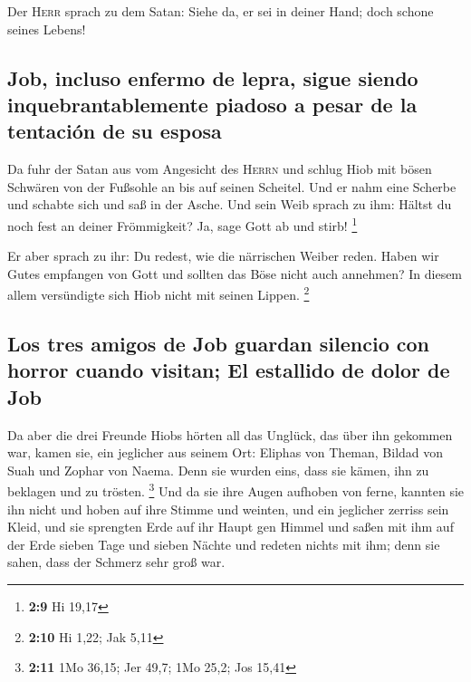  Der \textsc{Herr} sprach zu dem Satan: Siehe da, er sei
in deiner Hand; doch schone seines Lebens!

\hypertarget{job-incluso-enfermo-de-lepra-sigue-siendo-inquebrantablemente-piadoso-a-pesar-de-la-tentaciuxf3n-de-su-esposa}{%
\subsection{Job, incluso enfermo de lepra, sigue siendo
inquebrantablemente piadoso a pesar de la tentación de su
esposa}\label{job-incluso-enfermo-de-lepra-sigue-siendo-inquebrantablemente-piadoso-a-pesar-de-la-tentaciuxf3n-de-su-esposa}}

 Da fuhr der Satan aus vom Angesicht des \textsc{Herrn}
und schlug Hiob mit bösen Schwären von der Fußsohle an bis auf seinen
Scheitel.  Und er nahm eine Scherbe und schabte sich und
saß in der Asche.  Und sein Weib sprach zu ihm: Hältst du
noch fest an deiner Frömmigkeit? Ja, sage Gott ab und stirb! \footnote{\textbf{2:9}
  Hi 19,17}

 Er aber sprach zu ihr: Du redest, wie die närrischen
Weiber reden. Haben wir Gutes empfangen von Gott und sollten das Böse
nicht auch annehmen? In diesem allem versündigte sich Hiob nicht mit
seinen Lippen. \footnote{\textbf{2:10} Hi 1,22; Jak 5,11}

\hypertarget{los-tres-amigos-de-job-guardan-silencio-con-horror-cuando-visitan-el-estallido-de-dolor-de-job}{%
\subsection{Los tres amigos de Job guardan silencio con horror cuando
visitan; El estallido de dolor de
Job}\label{los-tres-amigos-de-job-guardan-silencio-con-horror-cuando-visitan-el-estallido-de-dolor-de-job}}

 Da aber die drei Freunde Hiobs hörten all das Unglück,
das über ihn gekommen war, kamen sie, ein jeglicher aus seinem Ort:
Eliphas von Theman, Bildad von Suah und Zophar von Naema. Denn sie
wurden eins, dass sie kämen, ihn zu beklagen und zu trösten. \footnote{\textbf{2:11}
  1Mo 36,15; Jer 49,7; 1Mo 25,2; Jos 15,41}  Und da sie
ihre Augen aufhoben von ferne, kannten sie ihn nicht und hoben auf ihre
Stimme und weinten, und ein jeglicher zerriss sein Kleid, und sie
sprengten Erde auf ihr Haupt gen Himmel  und saßen mit
ihm auf der Erde sieben Tage und sieben Nächte und redeten nichts mit
ihm; denn sie sahen, dass der Schmerz sehr groß war.

